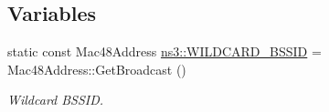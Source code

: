 \subsection*{Variables}
\begin{DoxyCompactItemize}
\item 
static const Mac48\+Address \hyperlink{namespacens3_aa7e7f97699766f2d1407d9151e3506a2}{ns3\+::\+W\+I\+L\+D\+C\+A\+R\+D\+\_\+\+B\+S\+S\+ID} = Mac48\+Address\+::\+Get\+Broadcast ()
\begin{DoxyCompactList}\small\item\em Wildcard B\+S\+S\+ID. \end{DoxyCompactList}\end{DoxyCompactItemize}

